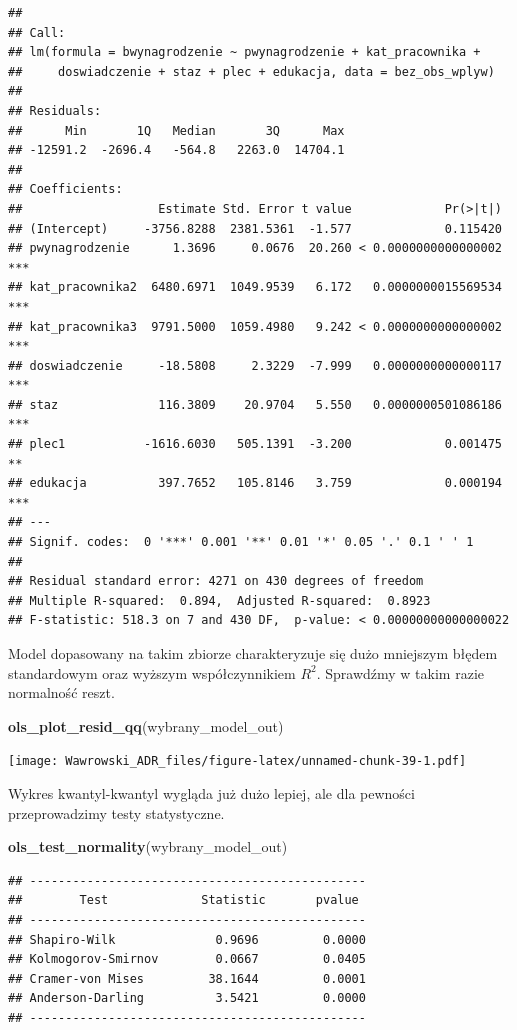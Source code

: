 \documentclass[]{book}
\newenvironment{Shaded}{\begin{snugshade}}{\end{snugshade}}
\newcommand{\KeywordTok}[1]{\textcolor[rgb]{0.13,0.29,0.53}{\textbf{#1}}}
\newcommand{\NormalTok}[1]{#1}
\begin{document}
\begin{verbatim}
## 
## Call:
## lm(formula = bwynagrodzenie ~ pwynagrodzenie + kat_pracownika + 
##     doswiadczenie + staz + plec + edukacja, data = bez_obs_wplyw)
## 
## Residuals:
##      Min       1Q   Median       3Q      Max 
## -12591.2  -2696.4   -564.8   2263.0  14704.1 
## 
## Coefficients:
##                   Estimate Std. Error t value             Pr(>|t|)    
## (Intercept)     -3756.8288  2381.5361  -1.577             0.115420    
## pwynagrodzenie      1.3696     0.0676  20.260 < 0.0000000000000002 ***
## kat_pracownika2  6480.6971  1049.9539   6.172   0.0000000015569534 ***
## kat_pracownika3  9791.5000  1059.4980   9.242 < 0.0000000000000002 ***
## doswiadczenie     -18.5808     2.3229  -7.999   0.0000000000000117 ***
## staz              116.3809    20.9704   5.550   0.0000000501086186 ***
## plec1           -1616.6030   505.1391  -3.200             0.001475 ** 
## edukacja          397.7652   105.8146   3.759             0.000194 ***
## ---
## Signif. codes:  0 '***' 0.001 '**' 0.01 '*' 0.05 '.' 0.1 ' ' 1
## 
## Residual standard error: 4271 on 430 degrees of freedom
## Multiple R-squared:  0.894,  Adjusted R-squared:  0.8923 
## F-statistic: 518.3 on 7 and 430 DF,  p-value: < 0.00000000000000022
\end{verbatim}

Model dopasowany na takim zbiorze charakteryzuje się dużo mniejszym błędem standardowym oraz wyższym współczynnikiem \(R^2\). Sprawdźmy w takim razie normalność reszt.

\begin{Shaded}
\begin{Highlighting}[]
\KeywordTok{ols_plot_resid_qq}\NormalTok{(wybrany_model_out)}
\end{Highlighting}
\end{Shaded}

\texttt{[image: Wawrowski\_ADR\_files/figure-latex/unnamed-chunk-39-1.pdf]}

Wykres kwantyl-kwantyl wygląda już dużo lepiej, ale dla pewności przeprowadzimy testy statystyczne.

\begin{Shaded}
\begin{Highlighting}[]
\KeywordTok{ols_test_normality}\NormalTok{(wybrany_model_out)}
\end{Highlighting}
\end{Shaded}

\begin{verbatim}
## -----------------------------------------------
##        Test             Statistic       pvalue  
## -----------------------------------------------
## Shapiro-Wilk              0.9696         0.0000 
## Kolmogorov-Smirnov        0.0667         0.0405 
## Cramer-von Mises         38.1644         0.0001 
## Anderson-Darling          3.5421         0.0000 
## -----------------------------------------------
\end{verbatim}
\end{document}

